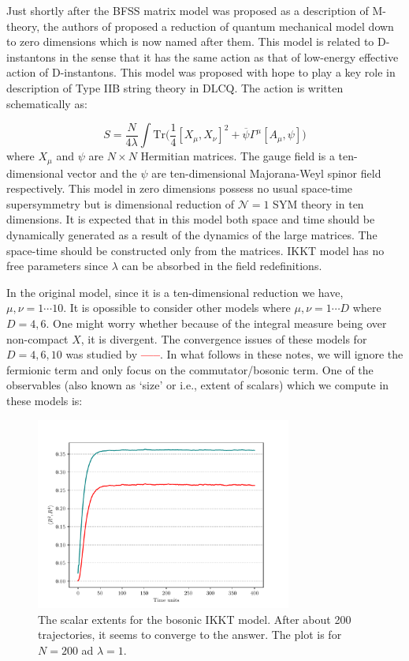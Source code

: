 \documentclass[11pt]{article}
\newcommand{\TODO}[1]{\textcolor{red}{{\bf #1}}}
\begin{document}
Just shortly after the BFSS matrix model was proposed as a description of M-theory, the authors of 
\cite{Ishibashi:1996xs} proposed a reduction of quantum mechanical model down to zero dimensions which is now named after them. This model is related to D-instantons in the sense that it has the same action as that of low-energy effective action of D-instantons. This model was proposed with hope to play a key role in description of Type IIB string theory in DLCQ. The action is written schematically as:

\begin{equation}
	\label{eq:IKKT} 
S = \frac{N}{4\lambda} \int \mbox{Tr} \Big( \frac{1}{4} [X_\mu, X_\nu]^{2} + \overline{\psi} \Gamma^{\mu} [A_{\mu},\psi] \Big) 
\end{equation}
where $X_{\mu}$ and $\psi$ are $N \times N$ Hermitian matrices. The gauge field is a ten-dimensional vector and the $\psi$ are ten-dimensional Majorana-Weyl spinor field respectively. This model in zero dimensions possess no usual space-time supersymmetry 
but is dimensional reduction of $\mathcal{N}=1$ SYM theory in ten dimensions. 
It is expected that in this model both space and time should be dynamically generated as a result of the dynamics of the large matrices. The space-time should be constructed only from the matrices. IKKT model has no free parameters since $\lambda$ can be absorbed in the field redefinitions. 

In the original model, since it is a ten-dimensional reduction we have, $\mu, \nu = 1 \cdots 10$. It is opossible to consider other models where $\mu, \nu = 1 \cdots D$ where $D=4,6$. One might worry whether because of the integral measure being over non-compact $X$, it is divergent. The convergence issues of these models for $D=4,6,10$ was studied by \TODO{-----}. In what follows in these notes, we will ignore the fermionic term and only focus on the commutator/bosonic term. One of the observables (also known as `size' or i.e., extent of scalars) which we compute in these models is:

\begin{figure}[htbp] 
	\centering 
	\includegraphics[width=0.75\textwidth]{figs/IKKT_plot.pdf}
	\caption{\label{fig:IKKT_1}The scalar extents for the bosonic IKKT model. After about 200 trajectories, it seems to converge to the answer. 
	The plot is for $N = 200$ ad $\lambda=1$.}
\end{figure}
\end{document}
